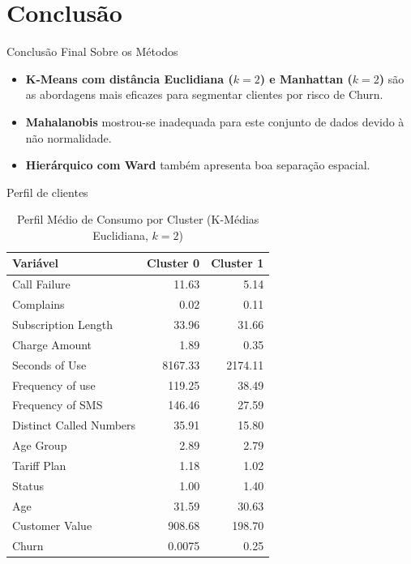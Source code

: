 \documentclass[10pt]{beamer}
\begin{document}
\section{Conclusão}

\begin{frame}{Conclusão Final Sobre os Métodos}
    \begin{itemize}
        \item \textbf{K-Means com distância Euclidiana ($k=2$) e Manhattan ($k=2$)} são as abordagens mais eficazes para segmentar clientes por risco de Churn.
        \item \textbf{Mahalanobis} mostrou-se inadequada para este conjunto de dados devido à não normalidade.
        \item \textbf{Hierárquico com Ward} também apresenta boa separação espacial.
    \end{itemize}
\end{frame}

\begin{frame}{Perfil de clientes}

    \begin{table}[htbp]
        \centering
        \caption{Perfil Médio de Consumo por Cluster (K-Médias Euclidiana, $k=2$)}
        \label{tab:perfil_consumo_k2}
        \begin{tabular}{lrr}
        \toprule
        \textbf{Variável} & \textbf{Cluster 0} & \textbf{Cluster 1} \\
        \midrule
        Call Failure            & 11.63   & 5.14    \\
        Complains               & 0.02    & 0.11    \\
        Subscription Length     & 33.96   & 31.66   \\
        Charge Amount           & 1.89    & 0.35    \\
        Seconds of Use          & 8167.33 & 2174.11 \\
        Frequency of use        & 119.25  & 38.49   \\
        Frequency of SMS        & 146.46  & 27.59   \\
        Distinct Called Numbers & 35.91   & 15.80   \\
        Age Group               & 2.89    & 2.79    \\
        Tariff Plan             & 1.18    & 1.02    \\
        Status                  & 1.00    & 1.40    \\
        Age                     & 31.59   & 30.63   \\
        Customer Value          & 908.68  & 198.70  \\
        Churn                   & 0.0075    & 0.25    \\
        \bottomrule
        \end{tabular}
    \end{table}
\end{frame}
\end{document}
